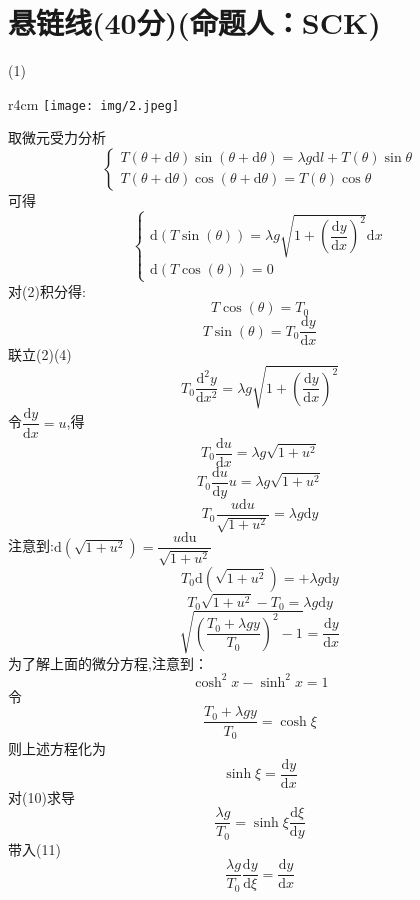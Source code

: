\documentclass{article}
\begin{document}
\section*{悬链线(40分)(命题人：SCK)}
\[\]
(1)
\par
\begin{wrapfigure}{r}{4cm}
	\vspace{-15pt}    %
	\texttt{[image: img/2.jpeg]}\\
	\vspace{-15pt}    %
	\caption{}
	\vspace{-15pt}    %
\end{wrapfigure}
取微元受力分析
\[
\begin{cases}
    T\left( \theta +\mathrm{d}\theta \right) \sin \left( \theta +\mathrm{d}\theta \right) = \lambda g\mathrm{d}l+T(\theta)\sin \theta \\
    T\left( \theta +\mathrm{d}\theta \right) \cos \left( \theta +\mathrm{d}\theta \right) =T(\theta)\cos \theta 
\end{cases}
\tag{1}
\]
可得
\[
\begin{cases}
\mathrm{d}(T\sin(\theta))=\lambda g \sqrt{1+\left(\dfrac{\mathrm{d}y}{\mathrm{d}x}\right)^2}\mathrm{d}x\\
\mathrm{d}(T\cos(\theta))=0
\end{cases}
\tag{2}
\]
对(2)积分得:
\[
T\cos(\theta)=T_0
\tag{3}
\]
\[
T\sin(\theta)=T_0\dfrac{\mathrm{d}y}{\mathrm{d}x} 
\tag{4}
\]
联立(2)(4)
\[
T_{0}\dfrac{\mathrm{d}^{2}y}{\mathrm{d}x^{2}}=\lambda g\sqrt{1+\left(\dfrac{\mathrm{d}y}{\mathrm{d}x}\right)^2}
\tag{5}
\]
令$\dfrac{\mathrm{d}y}{\mathrm{d}x}=u$,得
\[
T_{0}\dfrac{\mathrm{d}u}{\mathrm{d}x}=\lambda g\sqrt{1+u^{2}}
\tag{6}
\]
\[
T_{0}\dfrac{\mathrm{d}u}{\mathrm{d}y}u=\lambda g\sqrt{1+u^{2}}
\tag{7}
\]
\[
T_{0}\dfrac{u\mathrm{d}u}{\sqrt{1+u^{2}}}=\lambda g\mathrm{d}y
\tag{8}
\]
注意到:$\mathrm{d}\left( \sqrt{1+u^{2}}\right) =\dfrac{u\mathrm{du}}{\sqrt{1+u^{2}}}$
\[
    T_0\mathrm{d}\left( \sqrt{1+u^{2}}\right) = +\lambda g\mathrm{d}y
\]
\[
    T_{0}\sqrt{1+u^{2}}-T_{0}=\lambda g\mathrm{d}y
\]
\[
    \sqrt{\left( \dfrac{T_{0}+\lambda gy}{T_{0}}\right) ^{2}-1}=\dfrac{\mathrm{d}y}{\mathrm{d}x}
\]
为了解上面的微分方程,注意到：
\[
\cosh^2 x-\sinh^2 x=1
\tag{9}
\]
令
\[
\dfrac{T_{0}+\lambda gy}{T_{0}}=\cosh \xi 
\tag{10}
\]
则上述方程化为
\[
\sinh \xi=\dfrac{\mathrm{d}y}{\mathrm{d}x}
\tag{11}
\]
对(10)求导
\[
\dfrac{\lambda g}{T_{0}}=\sinh \xi\dfrac{\mathrm{d}\xi}{\mathrm{d}y}
\tag{12}
\]
带入(11)
\[
\dfrac{\lambda g}{T_{0}}\dfrac{\mathrm{d}y}{\mathrm{d}\xi}=\dfrac{\mathrm{d}y}{\mathrm{d}x}
\tag{13}
\]
\end{document}
